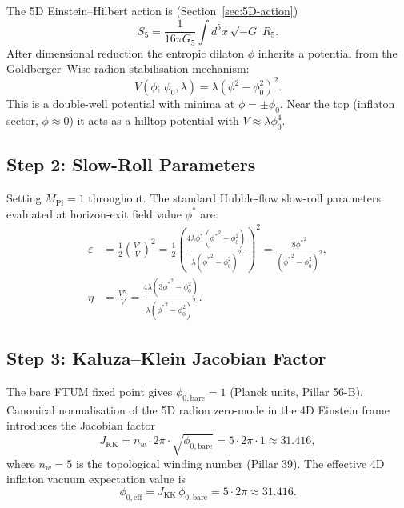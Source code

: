 \documentclass[12pt,a4paper]{article}
\begin{document}
The 5D Einstein--Hilbert action is (Section~\ref{sec:5D-action})
\begin{equation}
  S_5 = \frac{1}{16\pi G_5}\int d^5x\,\sqrt{-G}\;R_5 .
  \label{ns-eq:S5}
\end{equation}
After dimensional reduction the entropic dilaton $\phi$ inherits a potential
from the Goldberger--Wise radion stabilisation mechanism:
\begin{equation}
  V(\phi;\,\phi_0,\lambda) = \lambda(\phi^2 - \phi_0^2)^2 .
  \label{ns-eq:GW}
\end{equation}
This is a double-well potential with minima at $\phi = \pm\phi_0$.  Near
the top (inflaton sector, $\phi \approx 0$) it acts as a hilltop potential
with $V \approx \lambda\phi_0^4$.

\subsection*{Step 2: Slow-Roll Parameters}

Setting $M_\mathrm{Pl} = 1$ throughout.  The standard Hubble-flow slow-roll
parameters evaluated at horizon-exit field value $\phi^*$ are:
\begin{align}
  \varepsilon &= \frac{1}{2}\!\left(\frac{V'}{V}\right)^2
    = \frac{1}{2}\!\left(\frac{4\lambda\phi^*({\phi^*}^2-\phi_0^2)}
                                {\lambda({\phi^*}^2-\phi_0^2)^2}\right)^2
    = \frac{8{\phi^*}^2}{({\phi^*}^2-\phi_0^2)^2} ,
    \label{ns-eq:epsilon} \\[6pt]
  \eta &= \frac{V''}{V}
    = \frac{4\lambda(3{\phi^*}^2-\phi_0^2)}{\lambda({\phi^*}^2-\phi_0^2)^2} .
    \label{ns-eq:eta}
\end{align}

\subsection*{Step 3: Kaluza--Klein Jacobian Factor}

The bare FTUM fixed point gives $\phi_{0,\mathrm{bare}} = 1$ (Planck units,
Pillar 56-B).  Canonical normalisation of the 5D radion zero-mode in the 4D
Einstein frame introduces the Jacobian factor
\begin{equation}
  J_\mathrm{KK} = n_w \cdot 2\pi \cdot \sqrt{\phi_{0,\mathrm{bare}}}
                = 5 \cdot 2\pi \cdot 1 \approx 31.416 ,
  \label{ns-eq:JKK}
\end{equation}
where $n_w = 5$ is the topological winding number (Pillar 39).  The effective
4D inflaton vacuum expectation value is
\begin{equation}
  \phi_{0,\mathrm{eff}} = J_\mathrm{KK}\,\phi_{0,\mathrm{bare}}
                        = 5 \cdot 2\pi \approx 31.416 .
  \label{ns-eq:phi0eff}
\end{equation}
\end{document}
